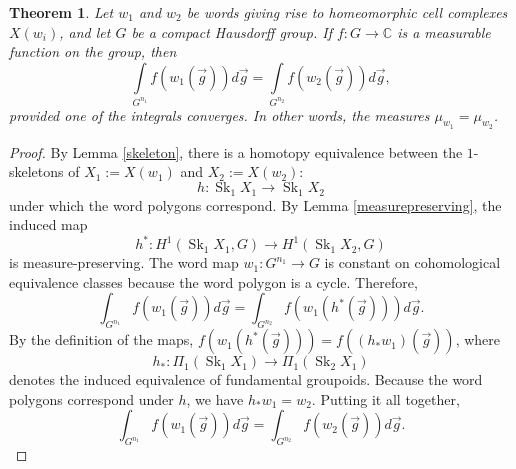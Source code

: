 \documentclass[12pt]{article}
\newtheorem{thm}{Theorem}[section]
\newcommand{\C}{\mathbb{C}}
\newcommand{\be}{\begin{equation}}
\newcommand{\ee}{\end{equation}}
\DeclareMathOperator{\Sk}{Sk}
\begin{document}
\begin{thm}\label{measures}
Let $w_1$ and $w_2$ be words giving rise to homeomorphic cell complexes $X(w_i)$, and let $G$ be a compact Hausdorff group.  If $f : G \to \C$ is a measurable function on the group, then
\be \int \limits_{G^{n_1}} f(w_1(\vec{g})) d\vec{g} = \int \limits_{G^{n_2}} f(w_2(\vec{g})) d\vec{g}, \ee
provided one of the integrals converges.  In other words, the measures $\mu_{w_1} = \mu_{w_2}$.
\end{thm}
\begin{proof}
By Lemma \ref{skeleton}, there is a homotopy equivalence between the $1$-skeletons of $X_1:=X(w_1)$ and $X_2:=X(w_2)$:
\be 
h: \Sk_1 X_1 \to \Sk_1 X_2
\ee
under which the word polygons correspond.
By Lemma \ref{measurepreserving}, the induced map
\be 
h^*: H^1(\Sk_1 X_1,G) \to H^1(\Sk_1 X_2,G)
\ee
is measure-preserving.  The word map $w_1 : G^{n_1} \to G$ is constant on cohomological equivalence classes because the word polygon is a cycle.  Therefore,
\be 
\int_{G^{n_1}} f(w_1(\vec{g}))d\vec{g} = \int_{G^{n_2}} f(w_1(h^*(\vec{g})))d\vec{g}.
\ee
By the definition of the maps, $f(w_1(h^*(\vec{g}))) = f((h_* w_1)(\vec{g}))$, where
\be 
h_* : \Pi_1(\Sk_1 X_1) \to \Pi_1(\Sk_2 X_1)
\ee
denotes the induced equivalence of fundamental groupoids.  Because the word polygons correspond under $h$, we have $h_* w_1 = w_2$.  Putting it all together,
\be 
\int_{G^{n_1}} f(w_1(\vec{g}))d\vec{g} = \int_{G^{n_2}} f(w_2(\vec{g}))d\vec{g}.
\ee
\end{proof}

\end{document}
